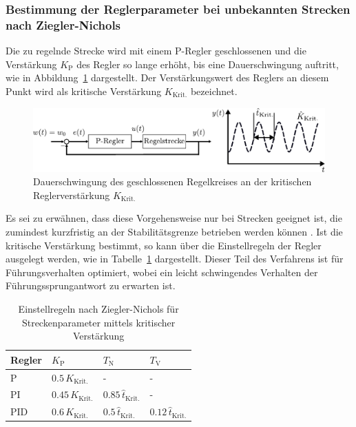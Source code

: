 \subsubsection{Bestimmung der Reglerparameter bei unbekannten Strecken nach Ziegler-Nichols}
%
Die zu regelnde Strecke wird mit einem P-Regler geschlossenen und die Verstärkung $K_{\text{P}}$ des Regler so lange erhöht, bis eine Dauerschwingung auftritt, wie in Abbildung~\ref{fig:ZieglerNicholsDauer} dargestellt. Der Verstärkungswert des Reglers an diesem Punkt wird als kritische Verstärkung $K_{\text{Krit.}}$ bezeichnet.
%
\begin{figure}[h]
	\centering
	\includegraphics[width=1\linewidth]{Abbildungen/Reglerentwurf/PDF/ZieglerNicholsSchwingung.pdf}
	\caption{Dauerschwingung des geschlossenen Regelkreises an der kritischen Reglerverstärkung $K_{\text{Krit.}}$}
	\label{fig:ZieglerNicholsDauer}
\end{figure}
%
Es sei zu erwähnen, dass diese Vorgehensweise nur bei Strecken geeignet ist, die zumindest kurzfristig an der Stabilitätsgrenze betrieben werden können \cite{Lunze10}. Ist die kritische Verstärkung bestimmt, so kann über die Einstellregeln der Regler ausgelegt werden, wie in Tabelle~\ref{tab:ziegler-nichols-krit} dargestellt. Dieser Teil des Verfahrens ist für Führungsverhalten optimiert, wobei ein leicht schwingendes Verhalten der Führungssprungantwort zu erwarten ist.
%
\begin{table}[h]\centering
	\caption{Einstellregeln nach Ziegler-Nichols für Streckenparameter mittels kritischer Verstärkung}
	\begin{tabular}{@{}llll@{}}\toprule
		Regler & $K_{\text{P}}$ & $T_{\text{N}}$ & $T_{\text{V}}$ \\ \bottomrule\bottomrule
		P & $0.5\,K_{\text{Krit.}}$ & - & - \\
		PI & $0.45\,K_{\text{Krit.}}$ & ${0.85}\,\hat{t}_{\text{Krit.}}$ & - \\
		PID & $0.6\,K_{\text{Krit.}}$ & ${0.5}\,\hat{t}_{\text{Krit.}}$ & ${0.12}\,\hat{t}_{\text{Krit.}}$ \\
		\bottomrule
	\end{tabular}
	\label{tab:ziegler-nichols-krit}
\end{table}
%
